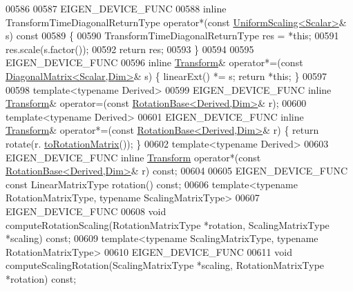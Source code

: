\begin{DoxyCode}
00586   
00587   EIGEN\_DEVICE\_FUNC
00588   \textcolor{keyword}{inline} TransformTimeDiagonalReturnType operator*(\textcolor{keyword}{const} \hyperlink{class_eigen_1_1_uniform_scaling}{UniformScaling<Scalar>}& s)\textcolor{keyword}{
       const}
00589 \textcolor{keyword}{  }\{
00590     TransformTimeDiagonalReturnType res = *\textcolor{keyword}{this};
00591     res.scale(s.factor());
00592     \textcolor{keywordflow}{return} res;
00593   \}
00594 
00595   EIGEN\_DEVICE\_FUNC
00596   \textcolor{keyword}{inline} \hyperlink{group___geometry___module_class_eigen_1_1_transform}{Transform}& operator*=(\textcolor{keyword}{const} \hyperlink{group___core___module_class_eigen_1_1_diagonal_matrix}{DiagonalMatrix<Scalar,Dim>}& s) \{ 
      linearExt() *= s; \textcolor{keywordflow}{return} *\textcolor{keyword}{this}; \}
00597 
00598   \textcolor{keyword}{template}<\textcolor{keyword}{typename} Derived>
00599   EIGEN\_DEVICE\_FUNC \textcolor{keyword}{inline} \hyperlink{group___geometry___module_class_eigen_1_1_transform}{Transform}& operator=(\textcolor{keyword}{const} 
      \hyperlink{class_eigen_1_1_rotation_base}{RotationBase<Derived,Dim>}& r);
00600   \textcolor{keyword}{template}<\textcolor{keyword}{typename} Derived>
00601   EIGEN\_DEVICE\_FUNC \textcolor{keyword}{inline} \hyperlink{group___geometry___module_class_eigen_1_1_transform}{Transform}& operator*=(\textcolor{keyword}{const} 
      \hyperlink{class_eigen_1_1_rotation_base}{RotationBase<Derived,Dim>}& r) \{ \textcolor{keywordflow}{return} rotate(r.
      \hyperlink{class_eigen_1_1_rotation_base_aac726e89402a427c605514ce31b01e42}{toRotationMatrix}()); \}
00602   \textcolor{keyword}{template}<\textcolor{keyword}{typename} Derived>
00603   EIGEN\_DEVICE\_FUNC \textcolor{keyword}{inline} \hyperlink{group___geometry___module_class_eigen_1_1_transform}{Transform} operator*(\textcolor{keyword}{const} 
      \hyperlink{class_eigen_1_1_rotation_base}{RotationBase<Derived,Dim>}& r) \textcolor{keyword}{const};
00604 
00605   EIGEN\_DEVICE\_FUNC \textcolor{keyword}{const} LinearMatrixType rotation() \textcolor{keyword}{const};
00606   \textcolor{keyword}{template}<\textcolor{keyword}{typename} RotationMatrixType, \textcolor{keyword}{typename} ScalingMatrixType>
00607   EIGEN\_DEVICE\_FUNC
00608   \textcolor{keywordtype}{void} computeRotationScaling(RotationMatrixType *rotation, ScalingMatrixType *scaling) \textcolor{keyword}{const};
00609   \textcolor{keyword}{template}<\textcolor{keyword}{typename} ScalingMatrixType, \textcolor{keyword}{typename} RotationMatrixType>
00610   EIGEN\_DEVICE\_FUNC
00611   \textcolor{keywordtype}{void} computeScalingRotation(ScalingMatrixType *scaling, RotationMatrixType *rotation) \textcolor{keyword}{const};

\end{DoxyCode}
